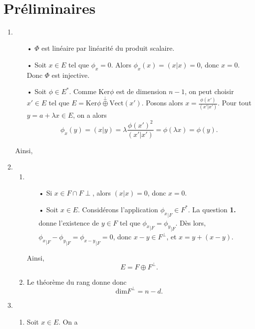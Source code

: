 \documentclass[a4paper,11pt]{article}
\newcommand{\titre}[1]{
		\colorbox{vert1}{
		\parbox{\headwidth}{
			\center{\Large{\sffamily\bfseries{\color{gris}{#1}}}}\\
			\vspace*{1em}
		}}
	}
\begin{document}
\thispagestyle{empty}				%
\pagecolor{gris}						%
\titre{Autour des matrices de Frobenius – Corrigé}		%
\vspace*{1em}

\section{Préliminaires}
\begin{enumerate}
\item \begin{itemize}
\item[•] $\Phi$ est linéaire par linéarité du produit scalaire.
\item[•] Soit $x\in E$ tel que $\phi_x=0$. Alors $\phi_x(x)=(x\vert x)=0$, donc $x=0$. Donc $\Phi$ est injective.
\item[•] Soit $\phi\in E^*$. Comme $\mathrm{Ker}\phi$ est de dimension $n-1$, on peut choisir $x'\in E$ tel que $E=\mathrm{Ker}\phi\overset{\perp}{\oplus}\mathrm{Vect}(x')$. Posons alors $x=\frac{\phi(x')}{(x'\vert x')}$. Pour tout $y=a+\lambda x\in E$, on a alors
\[
\phi_x(y)=(x\vert y)=\lambda\frac{\phi(x')^2}{(x'\vert x')}=\phi\left(\lambda x\right)=\phi(y).
\] 
\end{itemize}
Ainsi, 
\begin{center}
\end{center}
\item 
\begin{enumerate}
\item 
\begin{itemize}
\item[•] Si $x\in F\cap F\perp$, alors $(x\vert x)=0$, donc $x=0$.
\item[•] Soit $x\in E$. Considérons l'application ${\phi_x}_{\vert F}\in F^*$. La question {\sffamily\bfseries 1.} donne l'existence de $y\in F$ tel que ${\phi_x}_{\vert F}={\phi_y}_{\vert F}$. Dès lors, ${\phi_x}_{\vert F}-{\phi_y}_{\vert F}={\phi_{x-y}}_{\vert F}=0$, donc $x-y\in F^\perp$, et $x=y+(x-y)$.
\end{itemize}
Ainsi,
\[\boxed{E=F\oplus F^\perp.}\]
\item Le théorème du rang donne donc
\[\boxed{\mathrm{dim}F^\perp = n-d.}\]
\end{enumerate}
\item 
\begin{enumerate}
\item Soit $x\in E$. On a
\[
\]
\end{enumerate}
\end{enumerate}
\end{document}
